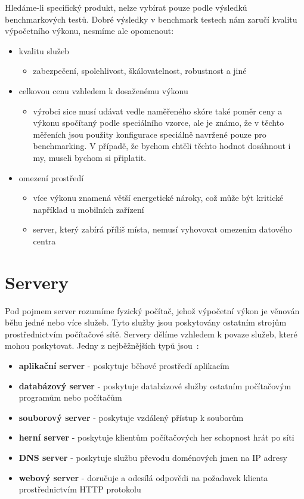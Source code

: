 \documentclass[122pt,oneside]{fithesis}
\begin{document}
Hledáme-li specifický produkt, nelze vybírat pouze podle výsledků benchmarkových testů. Dobré výsledky v benchmark testech nám zaručí kvalitu výpočetního výkonu, nesmíme ale opomenout:

\begin{itemize}
  \item kvalitu služeb
  \begin{itemize}
    \item zabezpečení, spolehlivost, škálovatelnost, robustnost a jiné
  \end{itemize}
  \item celkovou cenu vzhledem k dosaženému výkonu 
  \begin{itemize}
    \item  výrobci sice musí udávat vedle naměřeného skóre také poměr ceny a výkonu spočítaný podle speciálního vzorce, ale je známo, že v těchto měřeních jsou použity konfigurace speciálně navržené pouze pro benchmarking. V případě, že bychom chtěli těchto hodnot dosáhnout i my, museli bychom si připlatit.
  \end{itemize}
  \item omezení prostředí
  \begin{itemize}
    \item více výkonu znamená větší energetické nároky, což může být kritické například u mobilních zařízení
    \item server, který zabírá příliš místa, nemusí vyhovovat omezením datového centra
  \end{itemize}
\end{itemize}

\section{Servery}

Pod pojmem server rozumíme fyzický počítač, jehož výpočetní výkon je věnován běhu jedné nebo více služeb. Tyto služby jsou poskytovány ostatním strojům prostřednictvím počítačové sítě. Servery dělíme vzhledem k povaze služeb, které mohou poskytovat. Jedny z nejběžnějších typů jsou~\cite{wikiServerComp}:
\begin{itemize}
  \item {\bf aplikační server} - poskytuje běhové prostředí aplikacím
  \item {\bf databázový server} - poskytuje databázové služby ostatním počítačovým programům nebo počítačům
  \item {\bf souborový server} - poskytuje vzdálený přístup k souborům
  \item {\bf herní server} - poskytuje klientům počítačových her schopnost hrát po síti
  \item {\bf DNS server} - poskytuje službu převodu doménových jmen na IP adresy
  \item {\bf webový server} - doručuje a odesílá odpovědi na požadavek klienta prostřednictvím HTTP protokolu
\end{itemize}
\end{document}
